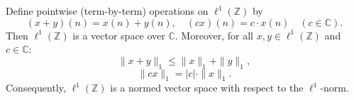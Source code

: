 Define pointwise (term-by-term) operations on $\ell^1(\mathbb{Z})$ by
$$(x + y)(n) = x(n) + y(n), \quad (cx)(n) = c \cdot x(n) \quad (c \in \mathbb{C}).$$
Then $\ell^1(\mathbb{Z})$ is a vector space over $\mathbb{C}$. Moreover, for all $x, y \in \ell^1(\mathbb{Z})$ and $c \in \mathbb{C}$:
$$\|x + y\|_1 \leq \|x\|_1 + \|y\|_1,$$
$$\|cx\|_1 = |c| \cdot \|x\|_1.$$
Consequently, $\ell^1(\mathbb{Z})$ is a normed vector space with respect to the $\ell^1$-norm.

